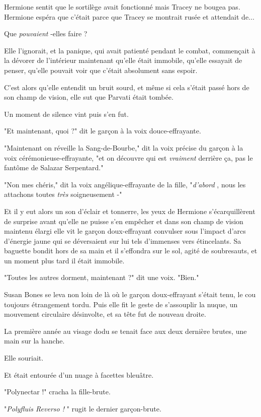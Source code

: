 Hermione sentit que le sortilège avait fonctionné mais Tracey ne bougea pas. Hermione espéra que c'était parce que Tracey se montrait rusée et attendait de...

Que \emph{pouvaient} -elles faire ?

Elle l'ignorait, et la panique, qui avait patienté pendant le combat, commençait à la dévorer de l'intérieur maintenant qu'elle était immobile, qu'elle essayait de penser, qu'elle pouvait voir que c'était absolument sans espoir.

C'est alors qu'elle entendit un bruit sourd, et même si cela s'était passé hors de son champ de vision, elle sut que Parvati était tombée.

Un moment de silence vint puis s'en fut.

"Et maintenant, quoi ?" dit le garçon à la voix douce-effrayante.

"Maintenant on réveille la Sang-de-Bourbe," dit la voix précise du garçon à la voix cérémonieuse-effrayante, "et on découvre qui est \emph{vraiment}  derrière ça, pas le fantôme de Salazar Serpentard."

"Non mes chéris," dit la voix angélique-effrayante de la fille, "\emph{d'abord} , nous les attachons toutes \emph{très}  soigneusement -"

Et il y eut alors un son d'éclair et tonnerre, les yeux de Hermione s'écarquillèrent de surprise avant qu'elle ne puisse s'en empêcher et dans son champ de vision maintenu élargi elle vit le garçon doux-effrayant convulser sous l'impact d'arcs d'énergie jaune qui se déversaient sur lui tels d'immenses vers étincelants. Sa baguette bondit hors de sa main et il s'effondra sur le sol, agité de soubresauts, et un moment plus tard il était immobile.

"Toutes les autres dorment, maintenant ?" dit une voix. "Bien."

Susan Bones se leva non loin de là où le garçon doux-effrayant s'était tenu, le cou toujours étrangement tordu. Puis elle fit le geste de s'assouplir la nuque, un mouvement circulaire désinvolte, et sa tête fut de nouveau droite.

La première année au visage dodu se tenait face aux deux dernière brutes, une main sur la hanche.

Elle souriait.

Et était entourée d'un nuage à facettes bleuâtre.

"Polynectar !" cracha la fille-brute.

"\emph{Polyfluis Reverso !} " rugit le dernier garçon-brute.

